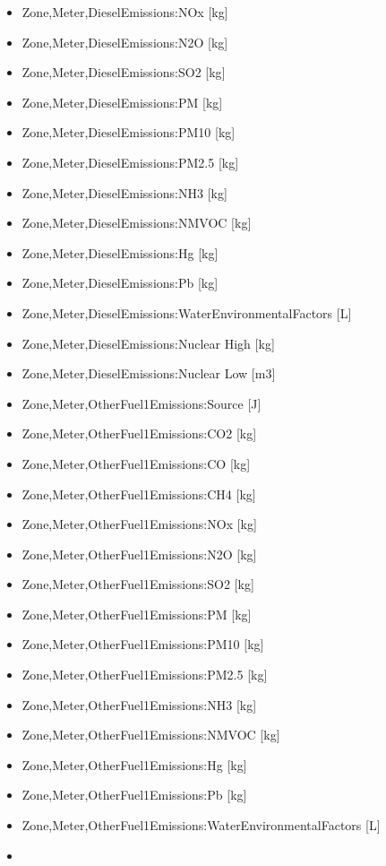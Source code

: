 \begin{itemize}
\item
  Zone,Meter,DieselEmissions:NOx {[}kg{]}
\item
  Zone,Meter,DieselEmissions:N2O {[}kg{]}
\item
  Zone,Meter,DieselEmissions:SO2 {[}kg{]}
\item
  Zone,Meter,DieselEmissions:PM {[}kg{]}
\item
  Zone,Meter,DieselEmissions:PM10 {[}kg{]}
\item
  Zone,Meter,DieselEmissions:PM2.5 {[}kg{]}
\item
  Zone,Meter,DieselEmissions:NH3 {[}kg{]}
\item
  Zone,Meter,DieselEmissions:NMVOC {[}kg{]}
\item
  Zone,Meter,DieselEmissions:Hg {[}kg{]}
\item
  Zone,Meter,DieselEmissions:Pb {[}kg{]}
\item
  Zone,Meter,DieselEmissions:WaterEnvironmentalFactors {[}L{]}
\item
  Zone,Meter,DieselEmissions:Nuclear High {[}kg{]}
\item
  Zone,Meter,DieselEmissions:Nuclear Low {[}m3{]}
\item
  Zone,Meter,OtherFuel1Emissions:Source {[}J{]}
\item
  Zone,Meter,OtherFuel1Emissions:CO2 {[}kg{]}
\item
  Zone,Meter,OtherFuel1Emissions:CO {[}kg{]}
\item
  Zone,Meter,OtherFuel1Emissions:CH4 {[}kg{]}
\item
  Zone,Meter,OtherFuel1Emissions:NOx {[}kg{]}
\item
  Zone,Meter,OtherFuel1Emissions:N2O {[}kg{]}
\item
  Zone,Meter,OtherFuel1Emissions:SO2 {[}kg{]}
\item
  Zone,Meter,OtherFuel1Emissions:PM {[}kg{]}
\item
  Zone,Meter,OtherFuel1Emissions:PM10 {[}kg{]}
\item
  Zone,Meter,OtherFuel1Emissions:PM2.5 {[}kg{]}
\item
  Zone,Meter,OtherFuel1Emissions:NH3 {[}kg{]}
\item
  Zone,Meter,OtherFuel1Emissions:NMVOC {[}kg{]}
\item
  Zone,Meter,OtherFuel1Emissions:Hg {[}kg{]}
\item
  Zone,Meter,OtherFuel1Emissions:Pb {[}kg{]}
\item
  Zone,Meter,OtherFuel1Emissions:WaterEnvironmentalFactors {[}L{]}
\item

\end{itemize}
